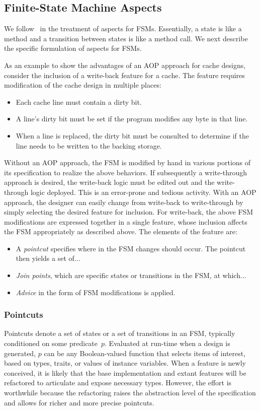 \documentclass[conference]{IEEEtran}
\begin{document}
\subsection{Finite-State Machine Aspects}

We follow~\cite{aspectsUML} in the treatment of aspects for FSMs. Essentially, a state is like a method and a transition between states is like a method call.  We next describe the specific formulation of aspects for FSMs.  

As an example to show the advantages of an AOP approach for cache designs, consider the inclusion of a write-back feature for a cache.  The feature requires modification of the cache design in multiple places:
\begin{itemize}
    \item Each cache line must contain a dirty bit.
    \item A line's dirty bit must be set if the program modifies any byte in that line.
    \item When a line is replaced, the dirty bit must be consulted to determine if the line needs to be written to the backing storage.
\end{itemize}
Without an AOP approach, the FSM is modified by hand in various portions of its specification to realize the above behaviors.   If subsequently a write-through approach is desired, the write-back logic must be edited out and the write-through logic deployed.  This is an error-prone and tedious activity.
With an AOP approach, the designer can easily change from write-back to write-through by simply selecting the desired feature for inclusion.  For write-back, the above FSM modifications are expressed together in a single feature, whose inclusion affects the FSM appropriately as described above.  The elements of the feature are:
\begin{itemize}
    \item A \emph{pointcut} specifies where in the FSM changes should occur.  The pointcut then yields a set of$\ldots$
    \item \emph{Join points}, which are specific states or transitions in the FSM, at which$\ldots$
    \item \emph{Advice} in the form of FSM modifications is applied.
\end{itemize}

\subsubsection{Pointcuts}
Pointcuts denote a set of states or a set of transitions in an FSM, typically conditioned on some predicate~$p$.
Evaluated at run-time when a design is generated, $p$ can be any Boolean-valued function that selects items of interest, based on types, traits, or values of instance variables.  When a feature is newly conceived, it is likely that the base implementation and extant features will be refactored to articulate and expose necessary types. However, the effort is worthwhile because the refactoring raises the abstraction level of the specification and allows for richer and more precise pointcuts.
\end{document}
